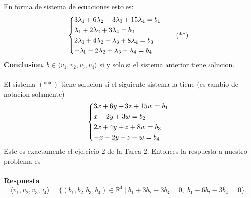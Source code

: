 \documentclass{article}
\theoremstyle{definition}
\theoremstyle{definition}
\theoremstyle{remark}
\begin{document}
En forma de sistema de ecuaciones esto es: \[
  \begin{dcases} 
    3\lambda_1 + 6\lambda_2 + 3\lambda_3 + 15\lambda_4 = b_1 \\
    \lambda_1 + 2\lambda_2 + 3\lambda_4 = b_2 \\
    2 \lambda_1 + 4\lambda_2 + \lambda_3 + 8\lambda_4 = b_3 \\
    -\lambda_1-2\lambda_2 + \lambda_3 - \lambda_4 = b_4
  \end{dcases}\tag{**}
\]
\textbf{Conclusion.} $b \in \langle v_1, v_2 ,v_3 ,v_4 \rangle $ si y solo si el sistema anterior tiene solucion.
\\\\
El sistema $(**)$ tiene solucion si el siguiente sistema la tiene (es cambio de notacion solamente)
\[
  \begin{dcases} 
    3x + 6y + 3z + 15w = b_1 \\
    x + 2y + 3w = b_2 \\
    2 x + 4y + z + 8w = b_3 \\
    -x-2y + z - w = b_4
  \end{dcases}
\]
Este es exactamente el ejercicio $2$ de la Tarea $2$. Entonces la respuesta a nuestro problema es \\\\
\textbf{Respuesta}\[
  \langle v_1,v_2,v_3,v_4 \rangle = \{(b_1,b_2,b_3,b_4)\in\mathbb{R}^4 \;|\; b_1 + 3 b_2 - 3b_3 = 0, \; b_1 - 6 b_2 - 3 b_4 = 0\}.
\]\pagebreak
\end{document}
